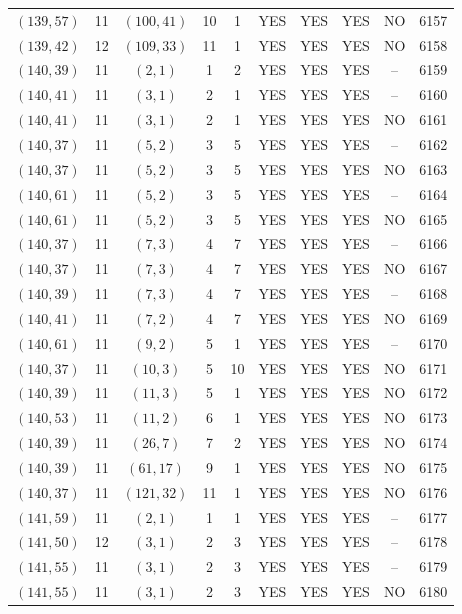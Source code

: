\begin{longtable}{|c|c|c|c|c|c|c|c|c|c|}
$(139, 57)$ & 11 & $(100, 41)$ & 10 & 1 & YES & YES & YES & NO & 6157\\
$(139, 42)$ & 12 & $(109, 33)$ & 11 & 1 & YES & YES & YES & NO & 6158\\
$(140, 39)$ & 11 & $(2, 1)$ & 1 & 2 & YES & YES & YES & -- & 6159\\
$(140, 41)$ & 11 & $(3, 1)$ & 2 & 1 & YES & YES & YES & -- & 6160\\
$(140, 41)$ & 11 & $(3, 1)$ & 2 & 1 & YES & YES & YES & NO & 6161\\
$(140, 37)$ & 11 & $(5, 2)$ & 3 & 5 & YES & YES & YES & -- & 6162\\
$(140, 37)$ & 11 & $(5, 2)$ & 3 & 5 & YES & YES & YES & NO & 6163\\
$(140, 61)$ & 11 & $(5, 2)$ & 3 & 5 & YES & YES & YES & -- & 6164\\
$(140, 61)$ & 11 & $(5, 2)$ & 3 & 5 & YES & YES & YES & NO & 6165\\
$(140, 37)$ & 11 & $(7, 3)$ & 4 & 7 & YES & YES & YES & -- & 6166\\
$(140, 37)$ & 11 & $(7, 3)$ & 4 & 7 & YES & YES & YES & NO & 6167\\
$(140, 39)$ & 11 & $(7, 3)$ & 4 & 7 & YES & YES & YES & -- & 6168\\
$(140, 41)$ & 11 & $(7, 2)$ & 4 & 7 & YES & YES & YES & NO & 6169\\
$(140, 61)$ & 11 & $(9, 2)$ & 5 & 1 & YES & YES & YES & -- & 6170\\
$(140, 37)$ & 11 & $(10, 3)$ & 5 & 10 & YES & YES & YES & NO & 6171\\
$(140, 39)$ & 11 & $(11, 3)$ & 5 & 1 & YES & YES & YES & NO & 6172\\
$(140, 53)$ & 11 & $(11, 2)$ & 6 & 1 & YES & YES & YES & NO & 6173\\
$(140, 39)$ & 11 & $(26, 7)$ & 7 & 2 & YES & YES & YES & NO & 6174\\
$(140, 39)$ & 11 & $(61, 17)$ & 9 & 1 & YES & YES & YES & NO & 6175\\
$(140, 37)$ & 11 & $(121, 32)$ & 11 & 1 & YES & YES & YES & NO & 6176\\
$(141, 59)$ & 11 & $(2, 1)$ & 1 & 1 & YES & YES & YES & -- & 6177\\
$(141, 50)$ & 12 & $(3, 1)$ & 2 & 3 & YES & YES & YES & -- & 6178\\
$(141, 55)$ & 11 & $(3, 1)$ & 2 & 3 & YES & YES & YES & -- & 6179\\
$(141, 55)$ & 11 & $(3, 1)$ & 2 & 3 & YES & YES & YES & NO & 6180\\

\end{longtable}

